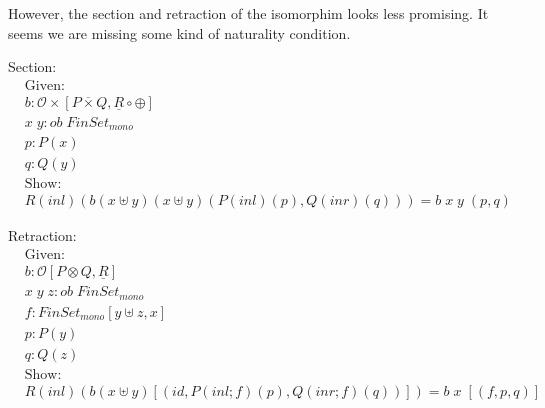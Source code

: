 \documentclass{article}
\begin{document}
However, the section and retraction of the isomorphim looks less promising. 
It seems we are missing some kind of naturality condition.

Section:
\begin{align*}
    &\textrm{Given:}\\
    &b : \mathcal{O\times}[P \overline{\times} Q , \underline{R} \circ \oplus]\\
    &x\;y : ob \;FinSet_{mono}\\
    &p : P(x)\\
    &q : Q(y)\\
    &\textrm{Show:}\\
    &R(inl)(b (x \uplus y)(x \uplus y)(P(inl)(p),Q(inr)(q))) = b\; x\; y\;(p ,q)
\end{align*}

Retraction:
\begin{align*}
    &\textrm{Given:}\\
    &b : \mathcal{O}[P \otimes Q , \underline{R}]\\
    &x \;y \;z : ob \;FinSet_{mono}\\
    &f : FinSet_{mono}[y \uplus z , x]\\
    &p : P(y)\\
    &q : Q(z)\\
    &\textrm{Show:}\\
    &R(inl)(b (x \uplus y)[(id , P(inl ; f)(p), Q(inr ; f)(q))]) = b \; x \; [(f , p , q)]
\end{align*}
\end{document}
